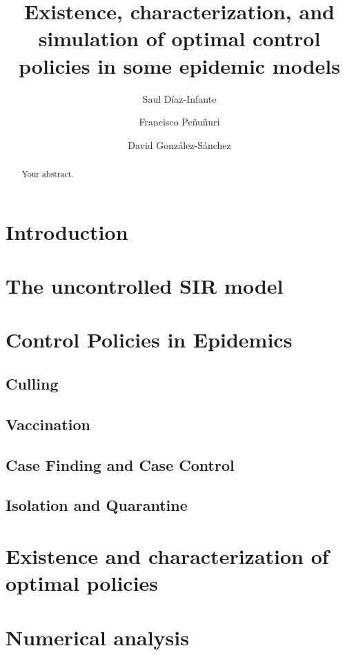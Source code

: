 \documentclass[titlepage]{amsart}
\title[%
	Existence, characterization and simulation of OCP for a family of epidemic 
	Models%
	]{
	Existence, characterization, and simulation
	of optimal control policies in some epidemic models
}
\author[S. D\'iaz-Infante]{Saul D\'iaz-Infante}
\author[F. Pe\~nu\~nuri]{Francisco Pe\~nu\~nuri}
\author[D. Gonz\'alez-S\'anchez]{David Gonz\'alez-S\'anchez}
\begin{document}
	\maketitle
  \begin{abstract}
  	Your abstract.
  \end{abstract}
%
%
  \section{Introduction}
    
  \section{The uncontrolled SIR model}
    
  \section{Control Policies in Epidemics}
    
    \subsection{Culling}
      
    \subsection{Vaccination}
      
    \subsection{Case Finding and Case Control}
      
    \subsection{Isolation and Quarantine}
      

  \section{Existence and characterization of optimal policies}
    
%
%
  \section{Numerical analysis}
    
    
\end{document}
